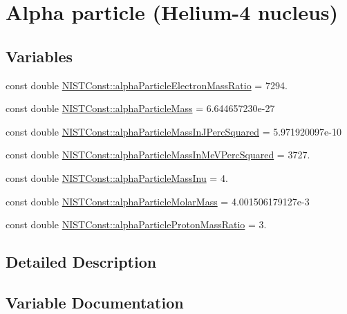 \hypertarget{group___n_i_s_t_const-_alpha}{}\section{Alpha particle (Helium-\/4 nucleus)}
\label{group___n_i_s_t_const-_alpha}
\subsection*{Variables}
\begin{DoxyCompactItemize}
\item 
const double \mbox{\hyperlink{group___n_i_s_t_const-_alpha_ga9f00b32c60f1bc5b8a950b58e64d08c8}{N\+I\+S\+T\+Const\+::alpha\+Particle\+Electron\+Mass\+Ratio}} = 7294.
\item 
const double \mbox{\hyperlink{group___n_i_s_t_const-_alpha_ga5a2a4f4310d2e3584253471fe4381b93}{N\+I\+S\+T\+Const\+::alpha\+Particle\+Mass}} = 6.\+644657230e-\/27
\item 
const double \mbox{\hyperlink{group___n_i_s_t_const-_alpha_ga90b635a865e315d2c4cd14c26560c7dd}{N\+I\+S\+T\+Const\+::alpha\+Particle\+Mass\+In\+J\+Perc\+Squared}} = 5.\+971920097e-\/10
\item 
const double \mbox{\hyperlink{group___n_i_s_t_const-_alpha_ga34f456e4d23d54ea0231ada958882a38}{N\+I\+S\+T\+Const\+::alpha\+Particle\+Mass\+In\+Me\+V\+Perc\+Squared}} = 3727.
\item 
const double \mbox{\hyperlink{group___n_i_s_t_const-_alpha_ga1233ffb0d6537e112ce39623e6c6d0d5}{N\+I\+S\+T\+Const\+::alpha\+Particle\+Mass\+Inu}} = 4.
\item 
const double \mbox{\hyperlink{group___n_i_s_t_const-_alpha_ga06d92f78de04d4e1d79b8468b04959ef}{N\+I\+S\+T\+Const\+::alpha\+Particle\+Molar\+Mass}} = 4.\+001506179127e-\/3
\item 
const double \mbox{\hyperlink{group___n_i_s_t_const-_alpha_ga4629465057dc35ad7eecca610bcbd092}{N\+I\+S\+T\+Const\+::alpha\+Particle\+Proton\+Mass\+Ratio}} = 3.
\end{DoxyCompactItemize}


\subsection{Detailed Description}


\subsection{Variable Documentation}
\mbox{\label{group___n_i_s_t_const-_alpha_ga9f00b32c60f1bc5b8a950b58e64d08c8}} 
